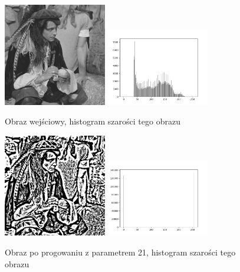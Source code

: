 \documentclass[final,a4paper,openany,12pt]{mwbk}
\begin{document}
\begin{figure}[H]
	\begin{center}
		\includegraphics[width=0.4\textwidth]{pirate_gray}
		\includegraphics[width=0.4\textwidth]{pirate_gray_histogram}
	\end{center}
	\caption{Obraz wejściowy, histogram szarości tego obrazu}
\end{figure}

\begin{figure}[H]
	\begin{center}
		\includegraphics[width=0.4\textwidth]{pirate_gray_locThreshold_result}
		\includegraphics[width=0.4\textwidth]{pirate_gray_locThreshold_histogram}
	\end{center}
	\caption{Obraz po progowaniu z parametrem 21, histogram szarości tego obrazu}
\end{figure}
\end{document}
